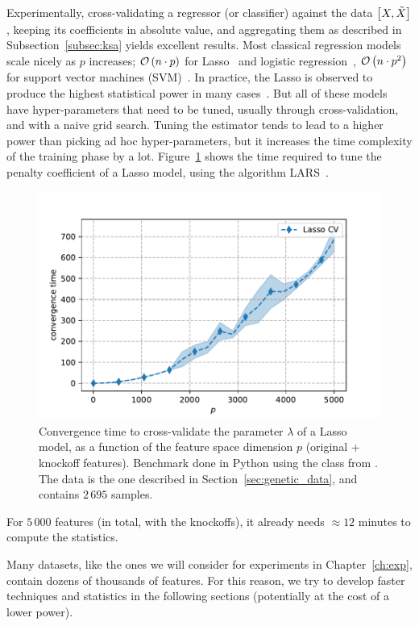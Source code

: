 Experimentally, cross-validating a regressor (or classifier) against the data $\big[ X, \tilde{X} \big]$,
keeping its coefficients in absolute value,
and aggregating them as described in Subsection~\ref{subsec:ksa} yields excellent results.
Most classical regression models scale nicely as $p$ increases;
$\mathcal{O}\left( n \cdot p \right)$ for Lasso~\citep{lasso} and logistic regression~\citep{logistic_regression},
$\mathcal{O}\left( n \cdot p^2 \right)$ for support vector machines (SVM)~\citep{svm}.
In practice, the Lasso is observed to produce the highest statistical power in many cases~\citep{model_x_knockoffs}.
But all of these models have hyper-parameters that need to be tuned,
usually through cross-validation,
and with a naive grid search.
Tuning the estimator tends to lead to a higher power than picking ad hoc hyper-parameters,
but it increases the time complexity of the training phase by a lot.
Figure~\ref{fig:lasso_times} shows the time required to tune the penalty coefficient of a Lasso model,
using the algorithm LARS~\citep{lars}.
\begin{figure}
    \centering
    \includegraphics[width=0.8\linewidth, height=0.5\linewidth]{figures/lasso_cv_times.pdf}
    \caption{
        Convergence time to cross-validate the parameter $\lambda$ of a Lasso model,
        as a function of the feature space dimension $p$ (original + knockoff features).
        Benchmark done in Python using the class  from .
        The data is the one described in Section~\ref{sec:genetic_data},
        and contains $2\,695$ samples.
    }
    \label{fig:lasso_times}
\end{figure}
For $5\,000$ features (in total, with the knockoffs),
it already needs $\approx 12$ minutes to compute the statistics.

Many datasets, like the ones we will consider for experiments in Chapter~\ref{ch:exp},
contain dozens of thousands of features.
For this reason, we try to develop faster techniques and statistics in the following sections
(potentially at the cost of a lower power).

